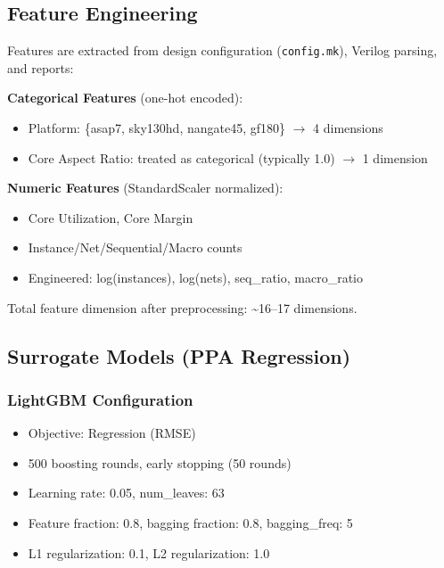 \documentclass[10pt,conference]{IEEEtran}
\newcommand{\ORFS}{\text{ORFS}}
\begin{document}
\subsection{Feature Engineering}
\label{sec:feature_engineering}

Features are extracted from design configuration (\texttt{config.mk}), Verilog parsing, and \ORFS{} reports:

\textbf{Categorical Features} (one-hot encoded):
\begin{itemize}
    \item Platform: \{asap7, sky130hd, nangate45, gf180\} $\rightarrow$ 4 dimensions
    \item Core Aspect Ratio: treated as categorical (typically 1.0) $\rightarrow$ 1 dimension
\end{itemize}

\textbf{Numeric Features} (StandardScaler normalized):
\begin{itemize}
    \item Core Utilization, Core Margin
    \item Instance/Net/Sequential/Macro counts
    \item Engineered: log(instances), log(nets), seq\_ratio, macro\_ratio
\end{itemize}

Total feature dimension after preprocessing: \textasciitilde 16--17 dimensions.

\subsection{Surrogate Models (PPA Regression)}
\label{sec:surrogate_models}

\subsubsection{LightGBM Configuration}
\begin{itemize}
    \item Objective: Regression (RMSE)
    \item 500 boosting rounds, early stopping (50 rounds)
    \item Learning rate: 0.05, num\_leaves: 63
    \item Feature fraction: 0.8, bagging fraction: 0.8, bagging\_freq: 5
    \item L1 regularization: 0.1, L2 regularization: 1.0
\end{itemize}
\end{document}
